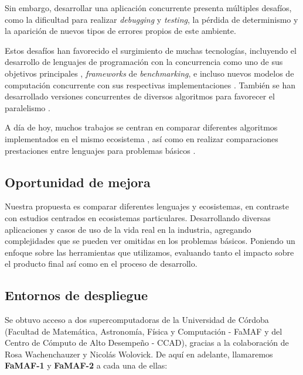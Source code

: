 \documentclass[11pt]{article}
\let\Oldsubsection\subsection
\renewcommand{\subsection}{\FloatBarrier\Oldsubsection}
\begin{document}
Sin embargo, desarrollar una aplicación concurrente presenta múltiples desafíos, como la dificultad para realizar \textit{debugging} y \textit{testing}, la pérdida de determinismo y la aparición de nuevos tipos de errores propios de este ambiente.

Estos desafíos han favorecido el surgimiento de muchas tecnologías, incluyendo el desarrollo de lenguajes de programación con la concurrencia como uno de sus objetivos principales \cite{rust:ex:fearless_concurrency} \cite{go:ex:concurrency_patterns}, \textit{frameworks} de \textit{benchmarking}, e incluso nuevos modelos de computación concurrente con sus respectivas implementaciones \cite{state_of_the_art:reactors}. También se han desarrollado versiones concurrentes de diversos algoritmos para favorecer el paralelismo \cite{state_of_the_art:huffman_gpu}.

A día de hoy, muchos trabajos se centran en comparar diferentes algoritmos implementados en el mismo ecosistema \cite{state_of_the_art:crypto_benchmarks} \cite{state_of_the_art:nn_benchmarks}, así como en realizar comparaciones prestaciones entre lenguajes para problemas básicos \cite{state_of_the_art:lang_benchmarks}.

\subsection{Oportunidad de mejora}

Nuestra propuesta es comparar diferentes lenguajes y ecosistemas, en contraste con estudios centrados en ecosistemas particulares.
Desarrollando diversas aplicaciones y casos de uso de la vida real en la industria, agregando complejidades que se pueden ver omitidas en los problemas básicos.
Poniendo un enfoque sobre las herramientas que utilizamos, evaluando tanto el impacto sobre el producto final así como en el proceso de desarrollo.

\subsection{Entornos de despliegue} \label{sec:deploy_envs}

Se obtuvo acceso a dos supercomputadoras de la Universidad de Córdoba (Facultad de Matemática, Astronomía, Física y Computación - FaMAF y del Centro de Cómputo de Alto Desempeño - CCAD), gracias a la colaboración de Rosa Wachenchauzer y Nicolás Wolovick. De aquí en adelante, llamaremos \textbf{FaMAF-1} y \textbf{FaMAF-2} a cada una de ellas:
\end{document}
